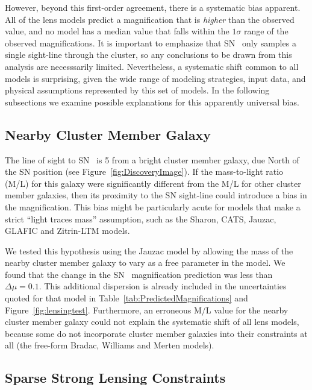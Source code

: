 However, beyond this first-order agreement, there is a systematic bias
apparent. All of the lens models predict a magnification that is {\it
higher} than the observed value, and no model has a median value that
falls within the $1\sigma$ range of the observed magnifications.  It
is important to emphasize that SN \tomas\ only samples a single
sight-line through the cluster, so any conclusions to be drawn from
this analysis are necesssarily limited.  Nevertheless, a systematic shift
common to all models is surprising, given the wide range of modeling
strategies, input data, and physical assumptions represented by this
set of models.  In the following subsections we examine possible
explanations for this apparently universal bias.

\subsection{Nearby Cluster Member Galaxy}
\label{sec:NearbyClusterMemberGalaxy}

The line of sight to SN \tomas\ is 5 from a bright cluster
member galaxy, due North of the SN position (see
Figure~\ref{fig:DiscoveryImage}).  If the mass-to-light ratio (M/L)
for this galaxy were significantly different from the M/L for other
cluster member galaxies, then its proximity to the SN sight-line could
introduce a bias in the magnification.  This bias might be
particularly acute for models that make a strict ``light traces mass''
assumption, such as the Sharon, CATS, Jauzac, GLAFIC and Zitrin-LTM
models.  

We tested this hypothesis using the Jauzac model by allowing the mass
of the nearby cluster member galaxy to vary as a free parameter in the
model. We found that the change in the SN \tomas\ magnification
prediction was less than $\Delta\mu=0.1$.  This additional dispersion
is already included in the uncertainties quoted for that model in
Table~\ref{tab:PredictedMagnifications} and
Figure~\ref{fig:lensingtest}.  Furthermore, an erroneous M/L
value for the nearby cluster member galaxy could not explain the
systematic shift of all lens models, because some do not incorporate
cluster member galaxies into their constraints at all (the free-form
Bradac, Williams and Merten models).

\subsection{Sparse Strong Lensing Constraints}
\label{sec:SparseStrongLensingConstraints}


